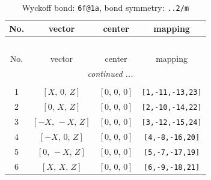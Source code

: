 \documentclass[fleqn,8pt]{jsarticle}
\begin{document}
\begin{longtable}{cccc}
\caption{Wyckoff bond: {\tt 6f@1a}, bond symmetry: {\tt ..2/m}}
 \\
 \hline \hline
No. & vector & center & mapping \\ \hline \endfirsthead

\multicolumn{3}{l}{\tablename\ \thetable{}} \\
 \hline \hline
No. & vector & center & mapping \\ \hline \endhead

 \hline \hline
\multicolumn{3}{r}{\footnotesize\it continued ...} \\ \endfoot

 \hline \hline
\multicolumn{3}{r}{} \\ \endlastfoot

1 & $\left[ X,\, 0,\, Z \right]$ & $\left[ 0,\, 0,\, 0 \right]$ & {\tt [1,-11,-13,23]} \\ \hline
2 & $\left[ 0,\, X,\, Z \right]$ & $\left[ 0,\, 0,\, 0 \right]$ & {\tt [2,-10,-14,22]} \\ \hline
3 & $\left[ - X,\, - X,\, Z \right]$ & $\left[ 0,\, 0,\, 0 \right]$ & {\tt [3,-12,-15,24]} \\ \hline
4 & $\left[ - X,\, 0,\, Z \right]$ & $\left[ 0,\, 0,\, 0 \right]$ & {\tt [4,-8,-16,20]} \\ \hline
5 & $\left[ 0,\, - X,\, Z \right]$ & $\left[ 0,\, 0,\, 0 \right]$ & {\tt [5,-7,-17,19]} \\ \hline
6 & $\left[ X,\, X,\, Z \right]$ & $\left[ 0,\, 0,\, 0 \right]$ & {\tt [6,-9,-18,21]} \\
\end{longtable}
\renewcommand{\arraystretch}{1.2}
\end{document}
